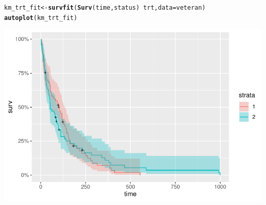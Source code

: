 \documentclass[a4paper, oneside]{book}\usepackage[]{graphicx}\usepackage[]{color}
\makeatletter
\def\maxwidth{ %
  \ifdim\Gin@nat@width>\linewidth
    \linewidth
  \else
    \Gin@nat@width
  \fi
}
\newcommand{\hlopt}[1]{\textcolor[rgb]{0,0,0}{#1}}%
\newcommand{\hlstd}[1]{\textcolor[rgb]{0.345,0.345,0.345}{#1}}%
\newcommand{\hlkwb}[1]{\textcolor[rgb]{0.69,0.353,0.396}{#1}}%
\newcommand{\hlkwc}[1]{\textcolor[rgb]{0.333,0.667,0.333}{#1}}%
\newcommand{\hlkwd}[1]{\textcolor[rgb]{0.737,0.353,0.396}{\textbf{#1}}}%
\newenvironment{kframe}{%
 \def\at@end@of@kframe{}%
 \ifinner\ifhmode%
  \def\at@end@of@kframe{\end{minipage}}%
  \begin{minipage}{\columnwidth}%
 \fi\fi%
 \def\FrameCommand##1{\hskip\@totalleftmargin \hskip-\fboxsep
 \colorbox{shadecolor}{##1}\hskip-\fboxsep
     \hskip-\linewidth \hskip-\@totalleftmargin \hskip\columnwidth}%
 \MakeFramed {\advance\hsize-\width
   \@totalleftmargin\z@ \linewidth\hsize
   \@setminipage}}%
 {\par\unskip\endMakeFramed%
 \at@end@of@kframe}
\newenvironment{knitrout}{}{} %
\makeatother
\begin{document}
\begin{knitrout}
\color{fgcolor}\begin{kframe}
\begin{alltt}
\hlstd{km_trt_fit} \hlkwb{<-} \hlkwd{survfit}\hlstd{(}\hlkwd{Surv}\hlstd{(time, status)} \hlopt{~} \hlstd{trt,} \hlkwc{data}\hlstd{=veteran)}
\hlkwd{autoplot}\hlstd{(km_trt_fit)}
\end{alltt}
\end{kframe}

{\centering \includegraphics[width=\maxwidth]{figure/script4-1} 

}



\end{knitrout}
\end{document}
